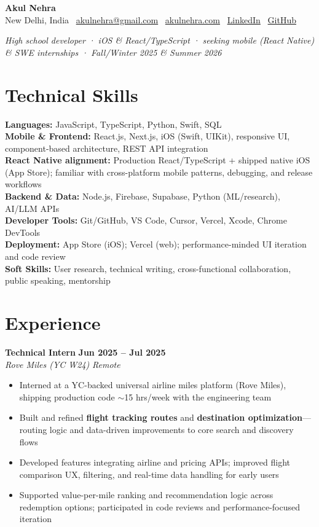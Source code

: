 \documentclass[11pt,letterpaper]{article}
\newcommand{\resumeSubheading}[4]{%
  \vspace{2pt}
  \textbf{#1} \hfill \textbf{#2} \\
  \textit{#3} \hfill \textit{#4} \\
}
\newcommand{\resumeItem}[1]{\item\small{#1}}
\begin{document}
\begin{center}
  {\LARGE \textbf{Akul Nehra}} \\[4pt]
  \small
  New Delhi, India \textbar\
  \href{mailto:akulnehra@gmail.com}{akulnehra@gmail.com} \textbar\
  \href{https://akulnehra.com}{akulnehra.com} \textbar\
  \href{https://www.linkedin.com/in/akul-nehra-629994330/}{LinkedIn} \textbar\
  \href{https://github.com/Akul-beep}{GitHub}
\end{center}

\vspace{2pt}
\begin{center}
  \small\textit{High school developer · iOS \& React/TypeScript · seeking mobile (React Native) \& SWE internships · Fall/Winter 2025 \& Summer 2026}
\end{center}

\section{Technical Skills}
\small
\textbf{Languages:} JavaScript, TypeScript, Python, Swift, SQL \\
\textbf{Mobile \& Frontend:} React.js, Next.js, iOS (Swift, UIKit), responsive UI, component-based architecture, REST API integration \\
\textbf{React Native alignment:} Production React/TypeScript + shipped native iOS (App Store); familiar with cross-platform mobile patterns, debugging, and release workflows \\
\textbf{Backend \& Data:} Node.js, Firebase, Supabase, Python (ML/research), AI/LLM APIs \\
\textbf{Developer Tools:} Git/GitHub, VS Code, Cursor, Vercel, Xcode, Chrome DevTools \\
\textbf{Deployment:} App Store (iOS); Vercel (web); performance-minded UI iteration and code review \\
\textbf{Soft Skills:} User research, technical writing, cross-functional collaboration, public speaking, mentorship

\section{Experience}

\resumeSubheading{Technical Intern}{Jun 2025 -- Jul 2025}{Rove Miles (YC W24)}{Remote}
\begin{itemize}[leftmargin=*, nosep, topsep=2pt]
  \resumeItem{Interned at a YC-backed universal airline miles platform (Rove Miles), shipping production code $\sim$15 hrs/week with the engineering team}
  \resumeItem{Built and refined \textbf{flight tracking routes} and \textbf{destination optimization}---routing logic and data-driven improvements to core search and discovery flows}
  \resumeItem{Developed features integrating airline and pricing APIs; improved flight comparison UX, filtering, and real-time data handling for early users}
  \resumeItem{Supported value-per-mile ranking and recommendation logic across redemption options; participated in code reviews and performance-focused iteration}
\end{itemize}
\end{document}
